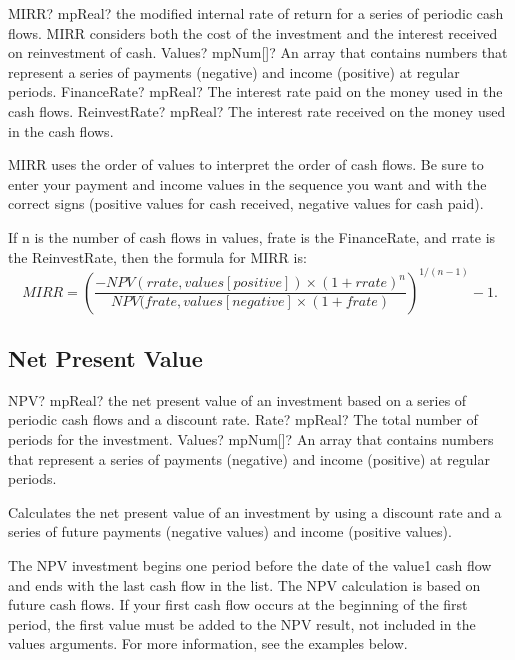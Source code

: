\begin{mpFunctionsExtract}
	\mpWorksheetFunctionThreeNotImplemented
	{MIRR? mpReal? the modified internal rate of return for a series of periodic cash flows. MIRR considers both the cost of the investment and the interest received on reinvestment of cash.}
	{Values? mpNum[]? An array that contains numbers that represent a series of payments (negative) and income (positive) at regular periods.}
	{FinanceRate? mpReal? The interest rate paid on the money used in the cash flows.}
	{ReinvestRate? mpReal? The interest rate received on the money used in the cash flows.}
\end{mpFunctionsExtract}

\vspace{0.3cm}
MIRR uses the order of values to interpret the order of cash flows. Be sure to enter your payment and income values in the sequence you want and with the correct signs (positive values for cash received, negative values for cash paid).

If n is the number of cash flows in values, frate is the FinanceRate, and rrate is the ReinvestRate, then the formula for MIRR is: 
\begin{equation}
	MIRR=\left(\frac{-NPV(rrate,values[positive]) \times(1+rrate)^n}{NPV(frate,values[negative] \times(1+frate)}  \right)^{1/(n-1)} - 1. 
\end{equation}



\subsection{Net Present Value}

\begin{mpFunctionsExtract}
	\mpWorksheetFunctionTwoNotImplemented
	{NPV? mpReal? the net present value of an investment based on a series of periodic cash flows and a discount rate.}
	{Rate? mpReal? The total number of periods for the investment.}
	{Values? mpNum[]? An array that contains numbers that represent a series of payments (negative) and income (positive) at regular periods.}
\end{mpFunctionsExtract}


\vspace{0.3cm}
Calculates the net present value of an investment by using a discount rate and a series of future payments (negative values) and income (positive values).

The NPV investment begins one period before the date of the value1 cash flow and ends with the last cash flow in the list. The NPV calculation is based on future cash flows. If your first cash flow occurs at the beginning of the first period, the first value must be added to the NPV result, not included in the values arguments. For more information, see the examples below.

